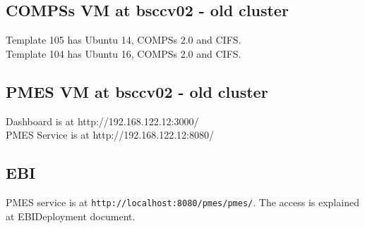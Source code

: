 \documentclass[a4paper,10pt]{article}
\begin{document}
\subsection{COMPSs VM at bsccv02 - old cluster}
Template 105 has Ubuntu 14, COMPSs 2.0 and CIFS.\\
Template 104 has Ubuntu 16, COMPSs 2.0 and CIFS.

\subsection{PMES VM at bsccv02 - old cluster}
Dashboard is at http://192.168.122.12:3000/ \\
PMES Service is at http://192.168.122.12:8080/ \\

\subsection{EBI}
PMES service is at \texttt{http://localhost:8080/pmes/pmes/}. The access is explained at EBIDeployment document.
\end{document}
